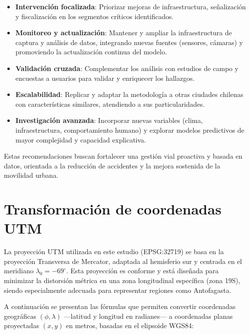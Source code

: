 \documentclass[12pt]{article}
\begin{document}
\begin{itemize}
    \item \textbf{Intervención focalizada}: Priorizar mejoras de infraestructura, señalización y fiscalización en los segmentos críticos identificados.
    \item \textbf{Monitoreo y actualización}: Mantener y ampliar la infraestructura de captura y análisis de datos, integrando nuevas fuentes (sensores, cámaras) y promoviendo la actualización continua del modelo.
    \item \textbf{Validación cruzada}: Complementar los análisis con estudios de campo y encuestas a usuarios para validar y enriquecer los hallazgos.
    \item \textbf{Escalabilidad}: Replicar y adaptar la metodología a otras ciudades chilenas con características similares, atendiendo a sus particularidades.
    \item \textbf{Investigación avanzada}: Incorporar nuevas variables (clima, infraestructura, comportamiento humano) y explorar modelos predictivos de mayor complejidad y capacidad explicativa.
\end{itemize}

Estas recomendaciones buscan fortalecer una gestión vial proactiva y basada en datos, orientada a la reducción de accidentes y la mejora sostenida de la movilidad urbana.

\newpage

\printbibliography

\newpage

\appendix

\setcounter{page}{1}

\section{Transformación de coordenadas UTM}
\label{ap:utm}

La proyección UTM utilizada en este estudio (EPSG:32719) se basa en la proyección Transversa de Mercator, adaptada al hemisferio sur y centrada en el meridiano $\lambda_0 = -69^\circ$. Esta proyección es conforme y está diseñada para minimizar la distorsión métrica en una zona longitudinal específica (zona 19S), siendo especialmente adecuada para representar regiones como Antofagasta.

A continuación se presentan las fórmulas que permiten convertir coordenadas geográficas $(\phi, \lambda)$ —latitud y longitud en radianes— a coordenadas planas proyectadas $(x, y)$ en metros, basadas en el elipsoide WGS84:
\end{document}
